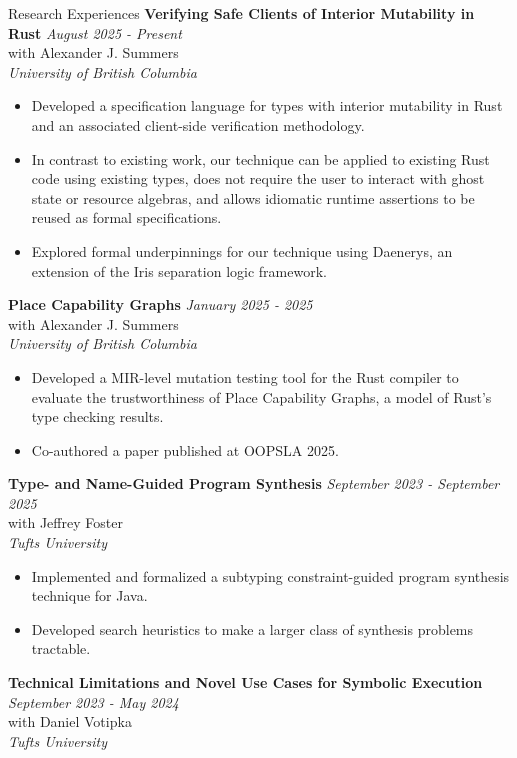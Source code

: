 \documentclass{resume} %
\begin{document}
\begin{rSection}{Research Experiences}
{\bf Verifying Safe Clients of Interior Mutability in Rust} \hfill {\em August 2025 - Present}\\
with Alexander J. Summers\\
{\it University of British Columbia}
\begin{itemize}
  \item Developed a specification language for types with interior mutability in Rust and an associated client-side verification methodology.
  \item In contrast to existing work, our technique can be applied to existing Rust code using existing types, does not require the user to interact with ghost state or resource algebras, and allows idiomatic runtime assertions to be reused as formal specifications.
  \item Explored formal underpinnings for our technique using Daenerys, an extension of the Iris separation logic framework.
\end{itemize}

{\bf Place Capability Graphs} \hfill {\em January 2025 - 2025}\\
with Alexander J. Summers\\
{\it University of British Columbia}
\begin{itemize}
  \item Developed a MIR-level mutation testing tool for the Rust compiler to evaluate the trustworthiness of Place Capability Graphs, a model of Rust's type checking results.
  \item Co-authored a paper published at OOPSLA 2025.
\end{itemize}

{\bf Type- and Name-Guided Program Synthesis} \hfill {\em September 2023 - September 2025}\\
with Jeffrey Foster \\
{\it Tufts University}
\begin{itemize}
    \item Implemented and formalized a subtyping constraint-guided program synthesis technique for Java.
    \item Developed search heuristics to make a larger class of synthesis problems tractable.
\end{itemize}

{\bf Technical Limitations and Novel Use Cases for Symbolic Execution} \hfill {\em September 2023 - May 2024}\\
with Daniel Votipka\\
{\it Tufts University}


\end{rSection}
\end{document}
